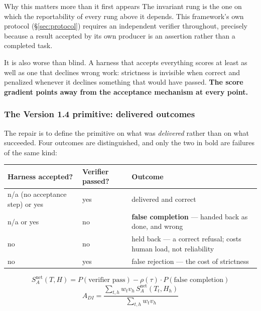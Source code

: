 \documentclass[11pt]{article}
\theoremstyle{definition}
\begin{document}
\begin{cautionbox}{Why this matters more than it first appears}
The invariant rung is the one on which the reportability of every rung above it depends. This framework's own protocol (\S\ref{sec:protocol}) requires an independent verifier throughout, precisely because a result accepted by its own producer is an assertion rather than a completed task.

It is also worse than blind. A harness that accepts everything scores at least as well as one that declines wrong work: strictness is invisible when correct and penalized whenever it declines something that would have passed. \textbf{The score gradient points away from the acceptance mechanism at every point.}
\end{cautionbox}

\subsubsection{The Version 1.4 primitive: delivered outcomes}

The repair is to define the primitive on what was \emph{delivered} rather than on what succeeded. Four outcomes are distinguished, and only the two in bold are failures of the same kind:

\begin{table}[h]
\centering\small
\begin{tabularx}{\textwidth}{@{}llY@{}}
\toprule
Harness accepted? & Verifier passed? & Outcome \\
\midrule
n/a (no acceptance step) or yes & yes & delivered and correct \\
n/a or yes & no & \textbf{false completion} --- handed back as done, and wrong \\
no & no & held back --- a correct refusal; costs human load, not reliability \\
no & yes & false rejection --- the cost of strictness \\
\bottomrule
\end{tabularx}
\end{table}

\begin{equation}
S^{\text{net}}_A(T,H) = P(\text{verifier pass}) - \rho(\tau)\cdot P(\text{false completion})
\label{eq:net}
\end{equation}
\begin{equation}
A_{DI} = \frac{\sum_{t,h} w_t v_h\, S^{\text{net}}_A(T_t,H_h)}{\sum_{t,h} w_t v_h}
\end{equation}
\end{document}
